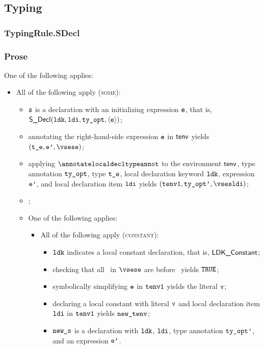 \subsection{Typing}
\subsubsection{TypingRule.SDecl\label{sec:TypingRule.SDecl}}
\subsubsection{Prose}
One of the following applies:
\begin{itemize}
  \item All of the following apply (\textsc{some}):
  \begin{itemize}
    \item $\texttt{s}$ is a declaration with an initializing expression $\texttt{e}$,
          that is, $\textsf{S\_Decl}(\texttt{ldk}, \texttt{ldi}, \texttt{ty\_opt}, \langle\texttt{e}\rangle)$;
    \item annotating the right-hand-side expression $\texttt{e}$ in $\textsf{tenv}$ yields $(\vte,\vep, \vsese)$\ProseOrTypeError;
    \item applying $\annotatelocaldecltypeannot$ to the environment $\textsf{tenv}$, type annotation $\texttt{ty\_opt}$, type $\texttt{t\_e}$, local declaration keyword $\texttt{ldk}$, expression $\texttt{e'}$, and local declaration item $\texttt{ldi}$ yields $(\tenvone, \tyoptp, \vsesldi)$\ProseOrTypeError;
    \item {};
    \item One of the following applies:
    \begin{itemize}
      \item All of the following apply (\textsc{constant}):
      \begin{itemize}
        \item $\texttt{ldk}$ indicates a local constant declaration, that is, $\textsf{LDK\_Constant}$;
        \item checking that all \timeframesterm\ in $\vsese$ are before \timeframeconstant\ yields $\texttt{TRUE}$\ProseOrTypeError;
        \item symbolically simplifying $\texttt{e}$ in $\texttt{tenv1}$ yields the literal $\texttt{v}$\ProseOrTypeError;
        \item declaring a local constant with literal $\texttt{v}$ and local declaration item $\texttt{ldi}$ in $\texttt{tenv1}$ yields $\texttt{new\_tenv}$;
        \item $\texttt{new\_s}$ is a declaration with $\texttt{ldk}$, $\texttt{ldi}$, type annotation $\texttt{ty\_opt'}$, and an expression $\texttt{e'}$.
      \end{itemize}


\end{itemize}
\end{itemize}
\end{itemize}
